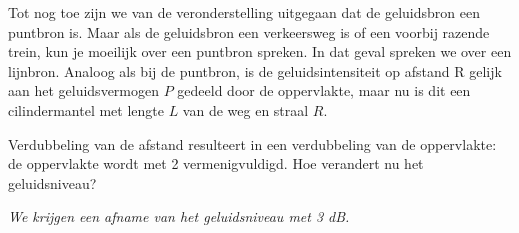 Tot nog toe zijn we van de veronderstelling uitgegaan dat de geluidsbron een puntbron is. Maar als de geluidsbron een verkeersweg is of een voorbij razende trein, kun je moeilijk over een puntbron spreken. In dat geval spreken we over een lijnbron.
Analoog als bij de puntbron, is de geluidsintensiteit op afstand R gelijk aan het geluidsvermogen $P$ gedeeld door de oppervlakte, maar nu is dit een cilindermantel met lengte $L$ van de weg en straal $R$.
\begin{werktekstoef}
\setcounter{enumi}{20}
\item {Verdubbeling van de afstand resulteert in een verdubbeling van de oppervlakte: de oppervlakte wordt met 2 vermenigvuldigd. Hoe verandert nu het geluidsniveau?}

\emph{We krijgen een afname van het geluidsniveau met 3 dB.}
\end{werktekstoef}
\eindewerktekst
\newpage

